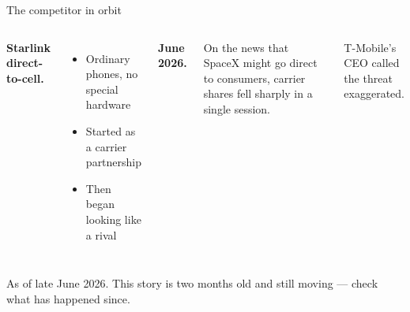 \begin{frame}{The competitor in orbit}
  \begin{columns}[T,onlytextwidth]
      \large\textbf{Starlink direct-to-cell.}

      \vspace{0.6em}
      \small
      \begin{itemize}\itemsep5pt
        \item Ordinary phones, no special hardware
        \item Started as a carrier partnership
        \item Then began looking like a rival
      \end{itemize}
      \large\textbf{June 2026.}

      \vspace{0.6em}
      \small
      On the news that SpaceX might go direct to consumers, carrier
      shares fell sharply in a single session.

      \vspace{0.5em}
      T-Mobile's CEO called the threat exaggerated.
  \end{columns}

  \vspace{0.7em}
  {\scriptsize\textcolor{softgray}{As of late June 2026. This story is two months
   old and still moving --- check what has happened since.}\par}

\end{frame}

